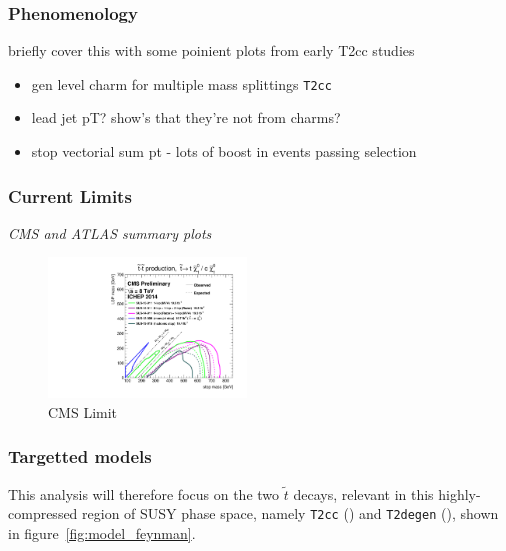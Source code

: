 \subsubsection{Phenomenology}
briefly cover this with some poinient plots from early T2cc studies

\begin{itemize}
\item gen level charm \Pt for multiple mass splittings \texttt{T2cc}
\item lead jet pT? show's that they're not from charms?
\item stop vectorial sum pt - lots of boost in events passing selection
\end{itemize}



\subsubsection{Current Limits}
\emph{CMS and ATLAS summary plots}

\begin{figure}
  \centering
  \includegraphics[width=0.47\textwidth]{Figs/other_limits/T2tt_ICHEP2014_All.pdf}
  \caption{CMS Limit}
  \label{fig:current_limit_cms}
\end{figure}

\subsubsection{Targetted models}
This analysis will therefore focus on the two $\tilde{t}$ decays, relevant in
this
highly-compressed region of SUSY phase space, namely \texttt{T2cc}
(\Ttwocc) and \texttt{T2degen} (\Ttwodegen), shown in
figure~\ref{fig:model_feynman}.

